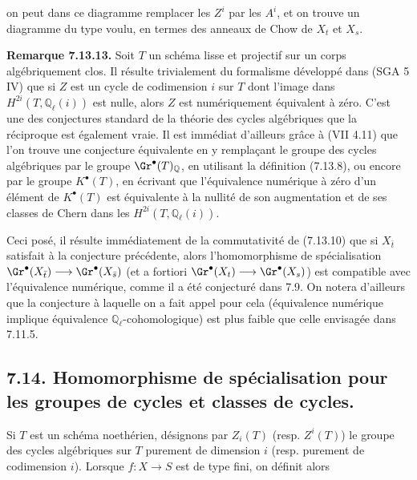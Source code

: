 
on peut dans ce diagramme remplacer les \(Z^i\) par les \(A^i\), et on trouve un diagramme du type voulu, en termes des anneaux de Chow de \(X_t\) et \(X_s\).

\textbf{Remarque 7.13.13.} Soit \(T\) un schéma lisse et projectif sur un corps algébriquement clos. Il résulte trivialement du formalisme développé dans (SGA 5 IV) que si \(Z\) est un cycle de codimension \(i\) sur \(T\) dont l'image dans \(H^{2i}(T,\mathbb Q_\ell(i))\) est nulle, alors \(Z\) est numériquement équivalent à zéro. C'est une des conjectures standard de la théorie des cycles algébriques que la réciproque est également vraie. Il est immédiat d'ailleurs grâce à (VII 4.11) que l'on trouve une conjecture équivalente en y remplaçant le groupe des cycles algébriques par le groupe \(\Gr^\bullet(T)_{\mathbb Q}\), en utilisant la définition (7.13.8), ou encore par le groupe \(K^\bullet(T)\), en écrivant que l'équivalence numérique à zéro d'un élément de \(K^\bullet(T)\) est équivalente à la nullité de son augmentation et de ses classes de Chern dans les \(H^{2i}(T,\mathbb Q_\ell(i))\).

Ceci posé, il résulte immédiatement de la commutativité de (7.13.10) que si \(X_{\bar t}\) satisfait à la conjecture précédente, alors l'homomorphisme de spécialisation \(\Gr^\bullet(X_{\bar t})\longrightarrow \Gr^\bullet(X_{\bar s})\) (et a fortiori \(\Gr^\bullet(X_t)\longrightarrow \Gr^\bullet(X_s)\)) est compatible avec l'équivalence numérique, comme il a été conjecturé dans 7.9. On notera d'ailleurs que la conjecture à laquelle on a fait appel pour cela (équivalence numérique implique équivalence \(\mathbb Q_\ell\)-cohomologique) est plus faible que celle envisagée dans 7.11.5.

\subsection*{7.14. Homomorphisme de spécialisation pour les groupes de cycles et classes de cycles.}
Si \(T\) est un schéma noethérien, désignons par \(Z_i(T)\) (resp. \(Z^i(T)\)) le groupe des cycles algébriques sur \(T\) purement de dimension \(i\) (resp. purement de codimension \(i\)). Lorsque \(f:X\to S\) est de type fini, on définit alors
